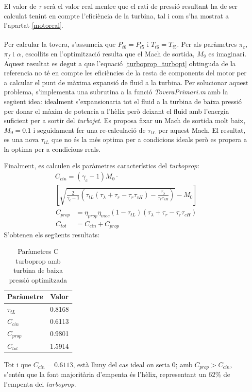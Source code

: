 \noindent El valor de $\tau$ serà el valor real mentre que el rati de pressió resultant ha de ser calculat tenint en compte l'eficiència de la turbina, tal i com s'ha mostrat a l'apartat \ref{motoreal}. \\
\\
Per calcular la tovera, s'assumeix que $P_{t6}=P_{t5}$ i $T_{t6}=T_{t5}$. Per als paràmetres $\pi_c$, $\pi_f$ i $\alpha$, escollits en l'optimització resulta que el Mach de sortida, $M_9$ es imaginari. Aquest resultat es degut a que l'equació \ref{turboprop_turbopt} obtinguda de la referencia \cite{mattingly} no té en compte les eficiències de la resta de components del motor per a calcular el punt de màxima expansió de fluid a la turbina.  
\noindent Per solucionar aquest problema, s'implementa una subrutina a la funció \textit{ToveraPrimari.m} amb la següent idea: idealment s'expansionaria tot el fluid a la turbina de baixa pressió per donar el màxim de potencia a l'hèlix però deixant el fluid amb l'energia suficient per a sortir del \textit{turbojet}. Es proposa fixar un Mach de sortida molt baix, $M_9 = 0.1$ i seguidament fer una  re-calculació de $\tau_{tL}$ per aquest Mach. El resultat, es una nova $\tau_{tL}$ que no és la més optima per a condicions ideals però es propera a la optima per a condicions reals.

\noindent Finalment, es calculen els paràmetres característics del \textit{turboprop}:
\begin{multline}
	C_{cin} = (\gamma_c-1)M_0\cdot\\
	\left[\sqrt{\frac{2}{\gamma_c-1}\left(\tau_{tL}(\tau_{\lambda}+\tau_r-\tau_r\tau_{cH})-\frac{\tau_{\lambda}}{\tau_r\tau_{cH}}\right)}-M_0\right] \label{turboprop_eqn1}
\end{multline}
	\begin{align}
	C_{prop} &= \eta_{prop}\eta_{mec}(1-\tau_{tL})(\tau_\lambda+\tau_r-\tau_r\tau_{cH}) \label{turboprop_eqn2}\\
	C_{tot} &= C_{cin} + C_{prop} \label{turboprop_eqn3}
	\end{align}
S'obtenen els següents resultats:
\begin{table}[H]
	\centering
	\begin{tabular}{lc}
		\toprule[3pt]
		\textbf{Paràmetre}&\textbf{Valor}\\
		\midrule[1pt]
		$\tau_{tL}$ & 0.8168\\
		$C_{cin}$ & 0.6113\\
		$C_{prop}$ & 0.9801\\
		$C_{tot}$ & 1.5914\\
		
		\bottomrule[2pt]
	\end{tabular}
\label{C_opti}
\caption{Paràmetres C turboprop amb turbina de baixa pressió optimitzada}
\end{table}
\noindent Tot i que $C_{cin}=0.6113$, està lluny del cas ideal on seria 0; amb $C_{prop}>C_{cin}$, s'entén que la font majoritària d'empenta és l'hèlix, representant un 62\% de l'empenta del \textit{turboprop}.


